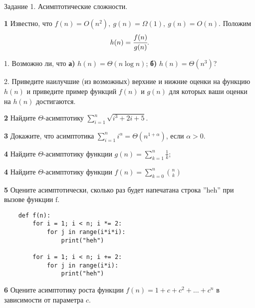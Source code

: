 \documentclass{article}
\begin{document}
\begin{center}
\Large {Задание 1. Асимптотические сложности.}
\end{center}

\bigskip

\textbf{1} Известно, что $f(n) = O(n^2),\ g(n) = \Omega(1),\ g(n) = O(n)$. Положим $$h(n) = \cfrac{f(n)}{g(n)}.$$ 

1. Возможно ли, что \textbf{а)} $h(n) = \Theta(n\log n)$; \textbf{б)} $h(n) = \Theta(n^3)$?

2. Приведите наилучшие (из возможных) верхние и нижние оценки на функцию $h(n)$ и приведите пример функций $f(n)$ и $g(n)$ для которых ваши оценки на $h(n)$ достигаются.

\medskip

\textbf{2} Найдите $\Theta$-асимптотику $\sum\limits_{i=1}^n \sqrt{i^3+2i+5}$.

\medskip

\textbf{3} Докажите, что асимптотика $\sum\limits^n_{i=1} i^{\alpha}
= \Theta(n^{1+\alpha})$, если
$\alpha > 0$.

\medskip

\textbf{4} Найдите $\Theta$-асимптотику функции
$g(n) = \sum\limits^n_{k=1} \frac{1}{k};$

\medskip

\textbf{4} Найдите $\Theta$-асимптотику функции $f(n) = \sum\limits^n_{k=0} {n \choose k}$

\medskip

\textbf{5} Оцените асимптотически, сколько раз будет напечатана строка ''heh'' при вызове функции $\text{f}$.

\begin{verbatim}
    def f(n):
        for i = 1; i < n; i *= 2:
            for j in range(i*i*i):
                print("heh")

        for i = 1; i < n; i += 2:
            for j in range(i*i):
                print("heh")
\end{verbatim}

\textbf{6} Оцените асимптотику роста функции $f(n) = 1 + c + c^2 + \dots + c^n$ в зависимости от параметра $c$.

\medskip
\end{document}

